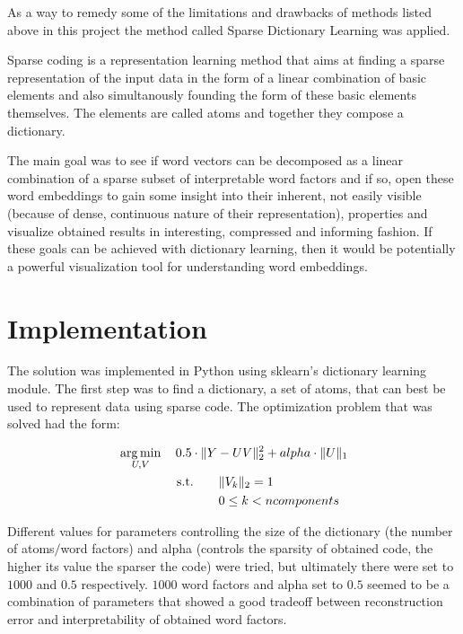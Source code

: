 \documentclass[10pt, a4paper, twocolumn]{article} %
\begin{document}
As a way to remedy some of the limitations and drawbacks of methods listed above in this project the method called Sparse Dictionary Learning was applied.

Sparse coding is a representation learning method that aims at finding a sparse representation of the input data in the form of a linear combination of basic elements and also simultanously founding the form of these basic elements themselves. The elements are called atoms and together they compose a dictionary.

The main goal was to see if word vectors can be decomposed as a linear combination of a sparse subset of interpretable word factors and if so, open these word embeddings to gain some insight into their inherent, not easily visible (because of dense, continuous nature of their representation), properties and visualize obtained results in interesting, compressed and informing fashion. If these goals can be achieved with dictionary learning, then it would be potentially a powerful visualization tool for understanding word embeddings.


\section{Implementation}

The solution was implemented in Python using sklearn’s dictionary learning module. The first step was to find a dictionary, a set of atoms, that can best be used to represent data using sparse code. The optimization problem that was solved had the form:

\begin{equation}
\begin{aligned}
& \operatorname*{arg\,min}_{U,V}
\quad {0.5 \cdot \|Y - U V\|_2^2 + alpha \cdot \|U\|_1} \\
& \quad \quad \quad \quad \ \ \text{s.t.} 
\quad \quad \|V_k\|_2 = 1 \\
& \quad \quad \quad \quad \quad \quad \quad \quad
0 \leq k < ncomponents \\
\end{aligned}
\end{equation}
            
Different values for parameters controlling the size of the dictionary (the number of atoms$/$word factors) and alpha (controls the sparsity of obtained code, the higher its value the sparser the code) were tried, but ultimately there were set to $1000$ and $0.5$ respectively. $1000$ word factors and alpha set to $0.5$ seemed to be a combination of parameters that showed a good tradeoff between reconstruction error and interpretability of obtained word factors.
\end{document}
